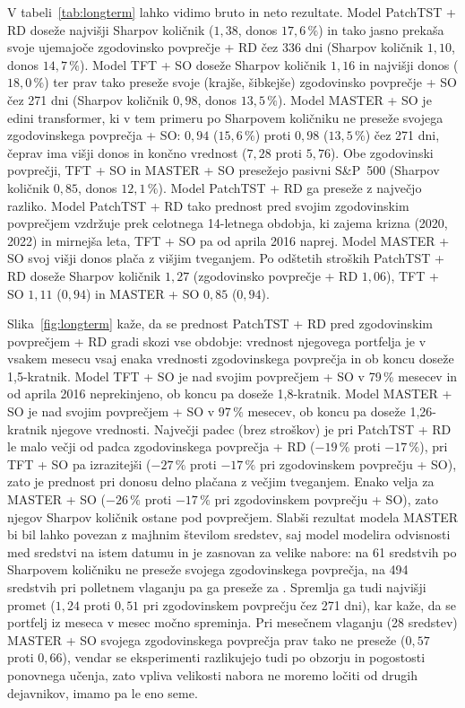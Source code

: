 \documentclass[9pt]{style/friteza}
\begin{document}
V tabeli~\ref{tab:longterm} lahko vidimo bruto in neto rezultate. Model PatchTST + RD doseže najvišji Sharpov količnik ($1{,}38$, donos $17{,}6\,\%$) in tako jasno prekaša svoje ujemajoče zgodovinsko povprečje + RD čez 336 dni (Sharpov količnik $1{,}10$, donos $14{,}7\,\%$). Model TFT + SO doseže Sharpov količnik $1{,}16$ in najvišji donos ($18{,}0\,\%$) ter prav tako preseže svoje (krajše, šibkejše) zgodovinsko povprečje + SO čez 271 dni (Sharpov količnik $0{,}98$, donos $13{,}5\,\%$). Model MASTER + SO je edini transformer, ki v tem primeru po Sharpovem količniku ne preseže svojega zgodovinskega povprečja + SO: $0{,}94$ ($15{,}6\,\%$) proti $0{,}98$ ($13{,}5\,\%$) čez 271 dni, čeprav ima višji donos in končno vrednost ($7{,}28$ proti $5{,}76$). Obe zgodovinski povprečji, TFT + SO in MASTER + SO presežejo pasivni S\&P~500 (Sharpov količnik $0{,}85$, donos $12{,}1\,\%$). Model PatchTST + RD ga preseže z največjo razliko. Model PatchTST + RD tako prednost pred svojim zgodovinskim povprečjem vzdržuje prek celotnega 14-letnega obdobja, ki zajema krizna (2020, 2022) in mirnejša leta, TFT + SO pa od aprila 2016 naprej. Model MASTER + SO svoj višji donos plača z višjim tveganjem. Po odštetih stroških PatchTST + RD doseže Sharpov količnik $1{,}27$ (zgodovinsko povprečje + RD $1{,}06$), TFT + SO $1{,}11$ ($0{,}94$) in MASTER + SO $0{,}85$ ($0{,}94$).

Slika~\ref{fig:longterm} kaže, da se prednost PatchTST + RD pred zgodovinskim povprečjem + RD gradi skozi vse obdobje: vrednost njegovega portfelja je v vsakem mesecu vsaj enaka vrednosti zgodovinskega povprečja in ob koncu doseže 1,5-kratnik. Model TFT + SO je nad svojim povprečjem + SO v 79\,\% mesecev in od aprila 2016 neprekinjeno, ob koncu pa doseže 1,8-kratnik. Model MASTER + SO je nad svojim povprečjem + SO v $97\,\%$ mesecev, ob koncu pa doseže 1,26-kratnik njegove vrednosti. Največji padec (brez stroškov) je pri PatchTST + RD le malo večji od padca zgodovinskega povprečja + RD ($-19\,\%$ proti $-17\,\%$), pri TFT + SO pa izrazitejši ($-27\,\%$ proti $-17\,\%$ pri zgodovinskem povprečju + SO), zato je prednost pri donosu delno plačana z večjim tveganjem. Enako velja za MASTER + SO ($-26\,\%$ proti $-17\,\%$ pri zgodovinskem povprečju + SO), zato njegov Sharpov količnik ostane pod povprečjem. Slabši rezultat modela MASTER bi bil lahko povezan z majhnim številom sredstev, saj model modelira odvisnosti med sredstvi na istem datumu in je zasnovan za velike nabore: na 61 sredstvih po Sharpovem količniku ne preseže svojega zgodovinskega povprečja, na 494 sredstvih pri polletnem vlaganju pa ga preseže za \WangMarginMASTER{}. Spremlja ga tudi najvišji promet ($1{,}24$ proti $0{,}51$ pri zgodovinskem povprečju čez 271 dni), kar kaže, da se portfelj iz meseca v mesec močno spreminja. Pri mesečnem vlaganju (28 sredstev) MASTER + SO svojega zgodovinskega povprečja prav tako ne preseže ($0{,}57$ proti $0{,}66$), vendar se eksperimenti razlikujejo tudi po obzorju in pogostosti ponovnega učenja, zato vpliva velikosti nabora ne moremo ločiti od drugih dejavnikov, imamo pa le eno seme.
\end{document}
